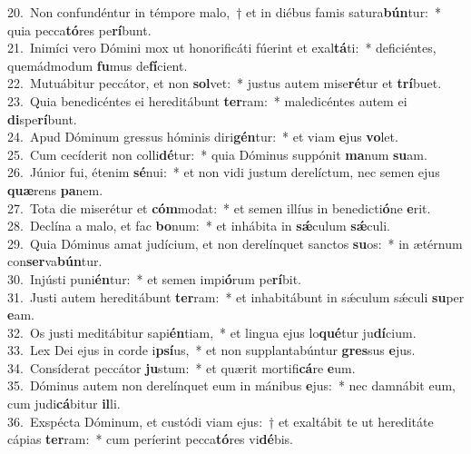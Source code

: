 {20.~}Non confundéntur in témpore malo,~† et in diébus famis satura\textbf{bún}tur:~* quia pecca\textbf{tó}res pe\textbf{rí}bunt.\\
{21.~}Inimíci vero Dómini mox ut honorificáti fúerint et exal\textbf{tá}ti:~* deficiéntes, quemádmodum \textbf{fu}mus de\textbf{fí}cient.\\
{22.~}Mutuábitur peccátor, et non \textbf{sol}vet:~* justus autem mise\textbf{ré}tur et \textbf{trí}buet.\\
{23.~}Quia benedicéntes ei hereditábunt \textbf{ter}ram:~* maledicéntes autem ei \textbf{di}spe\textbf{rí}bunt.\\
{24.~}Apud Dóminum gressus hóminis diri\textbf{gén}tur:~* et viam \textbf{e}jus \textbf{vo}let.\\
{25.~}Cum cecíderit non colli\textbf{dé}tur:~* quia Dóminus suppónit \textbf{ma}num \textbf{su}am.\\
{26.~}Júnior fui, étenim \textbf{sé}nui:~* et non vidi justum derelíctum, nec semen ejus \textbf{quæ}rens \textbf{pa}nem.\\
{27.~}Tota die miserétur et \textbf{cóm}modat:~* et semen illíus in benedicti\textbf{ó}ne \textbf{e}rit.\\
{28.~}Declína a malo, et fac \textbf{bo}num:~* et inhábita in \textbf{sǽ}culum \textbf{sǽ}culi.\\
{29.~}Quia Dóminus amat judícium, et non derelínquet sanctos \textbf{su}os:~* in ætérnum con\textbf{ser}va\textbf{bún}tur.\\
{30.~}Injústi puni\textbf{én}tur:~* et semen impi\textbf{ó}rum pe\textbf{rí}bit.\\
{31.~}Justi autem hereditábunt \textbf{ter}ram:~* et inhabitábunt in sǽculum sǽculi \textbf{su}per \textbf{e}am.\\
{32.~}Os justi meditábitur sapi\textbf{én}tiam,~* et lingua ejus lo\textbf{qué}tur ju\textbf{dí}cium.\\
{33.~}Lex Dei ejus in corde i\textbf{psí}us,~* et non supplantabúntur \textbf{gres}sus \textbf{e}jus.\\
{34.~}Consíderat peccátor \textbf{ju}stum:~* et quærit mortifi\textbf{cá}re \textbf{e}um.\\
{35.~}Dóminus autem non derelínquet eum in mánibus \textbf{e}jus:~* nec damnábit eum, cum judi\textbf{cá}bitur \textbf{il}li.\\
{36.~}Exspécta Dóminum, et custódi viam ejus:~† et exaltábit te ut hereditáte cápias \textbf{ter}ram:~* cum períerint pecca\textbf{tó}res vi\textbf{dé}bis.\\
